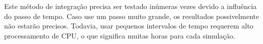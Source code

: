 Este método de integração precisa ser testado inúmeras vezes devido a influência do passo de tempo. Caso use um passo muito grande, os resultados possivelmente não estarão precisos. Todavia, usar pequenos intervalos de tempo requerem alto processamento de CPU, o que significa muitas horas para cada simulação.